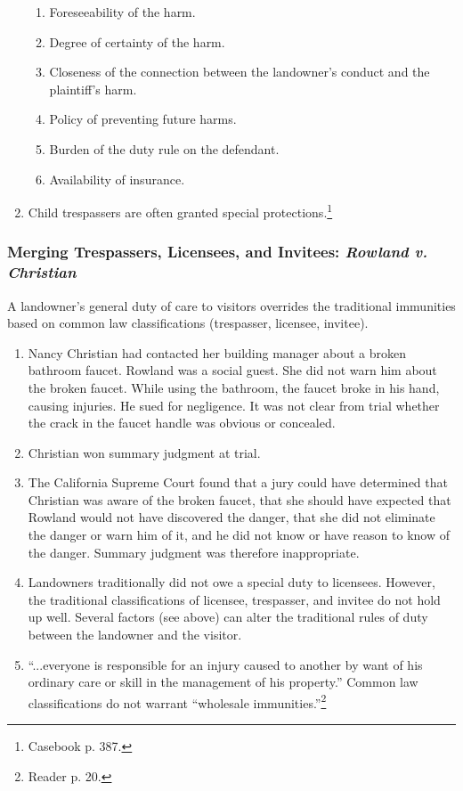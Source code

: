 \begin{enumerate}
\begin{enumerate}
        \item Foreseeability of the harm.
        \item Degree of certainty of the harm.
        \item Closeness of the connection between the landowner's conduct and 
        the plaintiff's harm.
        \item Policy of preventing future harms.
        \item Burden of the duty rule on the defendant.
        \item Availability of insurance.
    \end{enumerate}
    \item Child trespassers are often granted special 
    protections.\footnote{Casebook p. 387.}
\end{enumerate}

\subsubsection{Merging Trespassers, Licensees, and Invitees: \emph{Rowland v.  
Christian}}

A landowner's general duty of care to visitors overrides the traditional 
immunities based on common law classifications (trespasser, licensee, 
invitee).

\begin{enumerate}
    \item Nancy Christian had contacted her building manager about a broken 
    bathroom faucet. Rowland was a social guest. She did not warn him about 
    the broken faucet. While using the bathroom, the faucet broke in his hand, 
    causing injuries. He sued for negligence. It was not clear from trial 
    whether the crack in the faucet handle was obvious or concealed.
    \item Christian won summary judgment at trial.
    \item The California Supreme Court found that a jury could have determined 
    that Christian was aware of the broken faucet, that she should have 
    expected that Rowland would not have discovered the danger, that she did 
    not eliminate the danger or warn him of it, and he did not know or have 
    reason to know of the danger. Summary judgment was therefore 
    inappropriate.
    \item Landowners traditionally did not owe a special duty to licensees.  
    However, the traditional classifications of licensee, trespasser, and 
    invitee do not hold up well. Several factors (see above) can alter the 
    traditional rules of duty between the landowner and the visitor.
    \item ``...everyone is responsible for an injury caused to another by want 
    of his ordinary care or skill in the management of his property.'' Common 
    law classifications do not warrant ``wholesale 
    immunities.''\footnote{Reader p. 20.}
\end{enumerate}

